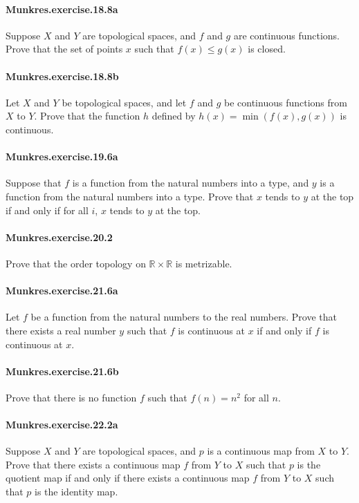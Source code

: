 \documentclass{article}
\begin{document}
\paragraph{Munkres.exercise.18.8a} Suppose $X$ and $Y$ are topological spaces, and $f$ and $g$ are continuous functions. Prove that the set of points $x$ such that $f(x) \leq g(x)$ is closed.

\paragraph{Munkres.exercise.18.8b} Let $X$ and $Y$ be topological spaces, and let $f$ and $g$ be continuous functions from $X$ to $Y$. Prove that the function $h$ defined by $h(x)=\min(f(x),g(x))$ is continuous.

\paragraph{Munkres.exercise.19.6a} Suppose that $f$ is a function from the natural numbers into a type, and $y$ is a function from the natural numbers into a type. Prove that $x$ tends to $y$ at the top if and only if for all $i$, $x$ tends to $y$ at the top.

\paragraph{Munkres.exercise.20.2} Prove that the order topology on $\mathbb{R} \times \mathbb{R}$ is metrizable.

\paragraph{Munkres.exercise.21.6a} Let $f$ be a function from the natural numbers to the real numbers. Prove that there exists a real number $y$ such that $f$ is continuous at $x$ if and only if $f$ is continuous at $x$.

\paragraph{Munkres.exercise.21.6b} Prove that there is no function $f$ such that $f(n)=n^2$ for all $n$.

\paragraph{Munkres.exercise.22.2a} Suppose $X$ and $Y$ are topological spaces, and $p$ is a continuous map from $X$ to $Y$. Prove that there exists a continuous map $f$ from $Y$ to $X$ such that $p$ is the quotient map if and only if there exists a continuous map $f$ from $Y$ to $X$ such that $p$ is the identity map.
\end{document}
